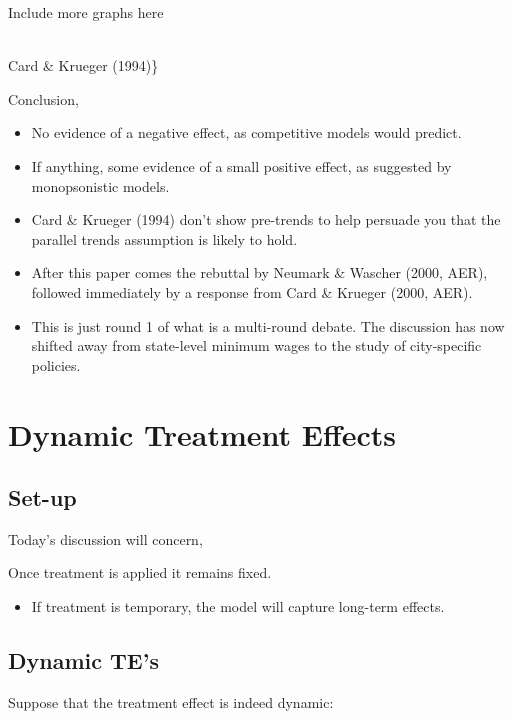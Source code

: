 \documentclass[
  letterpaper,
  DIV=11,
  numbers=noendperiod]{scrreprt}
\providecommand{\tightlist}{%
  \setlength{\itemsep}{0pt}\setlength{\parskip}{0pt}}\usepackage{longtable,booktabs,array}
\theoremstyle{definition}
\theoremstyle{remark}
\begin{document}
Include more graphs here\\
\strut \\
Card \& Krueger (1994)\}

Conclusion,

\begin{itemize}
\tightlist
\item
  No evidence of a negative effect, as competitive models would predict.
\item
  If anything, some evidence of a small positive effect, as suggested by
  monopsonistic models.
\item
  Card \& Krueger (1994) don't show pre-trends to help persuade you that
  the parallel trends assumption is likely to hold.
\item
  After this paper comes the rebuttal by Neumark \& Wascher (2000, AER),
  followed immediately by a response from Card \& Krueger (2000, AER).
\item
  This is just round 1 of what is a multi-round debate. The discussion
  has now shifted away from state-level minimum wages to the study of
  city-specific policies.
\end{itemize}

\hypertarget{dynamic-treatment-effects}{%
\chapter{Dynamic Treatment Effects}\label{dynamic-treatment-effects}}

\hypertarget{set-up}{%
\section{Set-up}\label{set-up}}

Today's discussion will concern,

Once treatment is applied it remains fixed.

\begin{itemize}
\tightlist
\item
  If treatment is temporary, the model will capture long-term effects.
\end{itemize}

\hypertarget{dynamic-tes}{%
\section{Dynamic TE's}\label{dynamic-tes}}

Suppose that the treatment effect is indeed dynamic:
\end{document}
